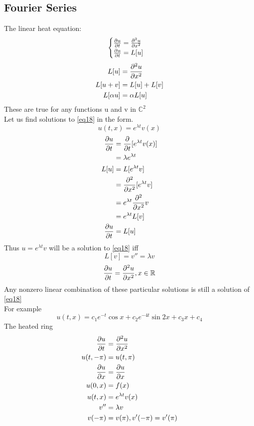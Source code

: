 \subsection{Fourier Series}
The linear heat equation:
\begin{equation}
    \label{eq18}\begin{cases}
\pdv{u}{t}=\pdv[2]{u}{x}\\
     \pdv{u}{t}=L[u]
\end{cases}
\end{equation}
\begin{align*}{}{}
L[u]&=\pdv[2]{u}{x}
\\L[u+v]&=L[u]+L[v]\\
L[\alpha u]&=\alpha L[u]
\end{align*}
These are true for any functions u and v in $ \mathbb{C}^2 $ \\
Let us find solutions to  \eqref{eq18} in the form.$$
    u(t,x)=e^{\lambda t}v(x)
$$ 
\begin{align*}{}{}
\pdv{u}{t}&=\pdv{t}[e^{\lambda t}v(x)]\\
&=\lambda e^{\lambda t}\\
L[u]&=L[e^{\lambda t }v]\\
&=\pdv[2]{x}[e^{\lambda t }v]\\
&=e^{\lambda t}\pdv[2]{x}v\\
&=e^{\lambda t}L[v]\\
\pdv{u}{t}&=L[u]\\
\end{align*}
Thus $ u=e^{\lambda t}v $ will be a solution to \eqref{eq18} iff $$
    L[v]=v''=\lambda v
$$ 
\begin{align*}{}{}
\pdv{u}{t}=\pdv[2]{u}{x},x\in \mathbb{R}
\end{align*}
Any nonzero linear combination of these particular solutions is still a solution of \eqref{eq18}\\
For example$$
    u(t,x)=c_1e^{-t}\cos{x}+c_2e^{-4t}\sin{2x}+c_3x+c_4
$$ The heated ring
\begin{align*}{}{}
\pdv{u}{t}&=\pdv[2]{u}{x}\\
u(t,-\pi)&=u(t,\pi)\\
\pdv{u}{x}(t,-\pi)&=\pdv{u}{x}(t,\pi)\\
u(0,x)&=f(x)\\
u(t,x)&=e^{\lambda t}v(x)\\
v''&=\lambda v\\
v(-\pi)&=v(\pi),v'(-\pi)=v'(\pi)\\
\end{align*}
